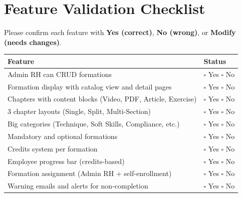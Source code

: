 \documentclass[11pt,a4paper]{article}
\begin{document}
\section{Feature Validation Checklist}

{\small\color{eygray} Please confirm each feature with \textbf{Yes (correct)}, \textbf{No (wrong)}, or \textbf{Modify (needs changes)}.}

\vspace{0.5em}

\renewcommand{\arraystretch}{1.4}
\begin{tabular}{|p{}|p{}|}
\hline
\textbf{Feature} & \textbf{Status} \\
\hline
Admin RH can CRUD formations & \hspace{1em} $\square$ Yes \quad $\square$ No \\
\hline
Formation display with catalog view and detail pages & \hspace{1em} $\square$ Yes \quad $\square$ No \\
\hline
Chapters with content blocks (Video, PDF, Article, Exercise) & \hspace{1em} $\square$ Yes \quad $\square$ No \\
\hline
3 chapter layouts (Single, Split, Multi-Section) & \hspace{1em} $\square$ Yes \quad $\square$ No \\
\hline
Big categories (Technique, Soft Skills, Compliance, etc.) & \hspace{1em} $\square$ Yes \quad $\square$ No \\
\hline
Mandatory and optional formations & \hspace{1em} $\square$ Yes \quad $\square$ No \\
\hline
Credits system per formation & \hspace{1em} $\square$ Yes \quad $\square$ No \\
\hline
Employee progress bar (credits-based) & \hspace{1em} $\square$ Yes \quad $\square$ No \\
\hline
Formation assignment (Admin RH + self-enrollment) & \hspace{1em} $\square$ Yes \quad $\square$ No \\
\hline
Warning emails and alerts for non-completion & \hspace{1em} $\square$ Yes \quad $\square$ No \\

\end{tabular}
\end{document}
